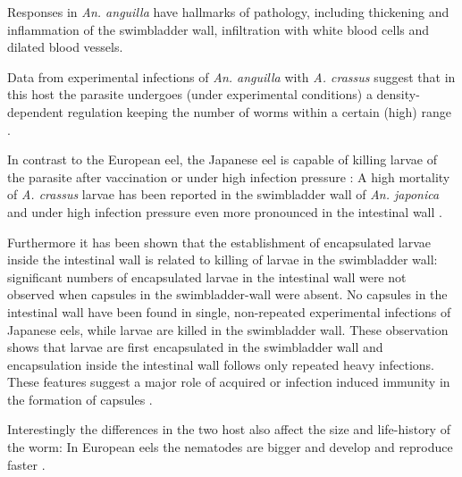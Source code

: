 Responses in \textit{An. anguilla} have hallmarks of pathology,
including thickening \cite{wurtz_tara_2000} and inflammation
\cite{beregi_radiodiagnostic_1998} of the swimbladder wall,
infiltration with white blood cells and dilated blood vessels.

Data from experimental infections of \textit{An. anguilla} with
\textit{A. crassus} suggest that in this host the parasite undergoes
(under experimental conditions) a density-dependent regulation keeping
the number of worms within a certain (high) range
\cite{fazio_regulation_2008}.

In contrast to the European eel, the Japanese eel is capable of
killing larvae of the parasite after vaccination
\cite{knopf_vaccination_2008} or under high infection pressure
\cite{heitlinger_massive_2009}: A high mortality of
\textit{A. crassus} larvae has been reported in the swimbladder wall
of \textit{An. japonica} \cite{mnderle_occurrence_2006} and under high
infection pressure even more pronounced in the intestinal wall
\cite{heitlinger_massive_2009}.

Furthermore it has been shown that the establishment of encapsulated
larvae inside the intestinal wall is related to killing of larvae in
the swimbladder wall: significant numbers of encapsulated larvae in
the intestinal wall were not observed when capsules in the
swimbladder-wall were absent. No capsules in the intestinal wall have
been found in single, non-repeated experimental infections of Japanese
eels, while larvae are killed in the swimbladder wall. These
observation shows that larvae are first encapsulated in the
swimbladder wall and encapsulation inside the intestinal wall follows
only repeated heavy infections. These features suggest a major role of
acquired or infection induced immunity in the formation of capsules
\cite{heitlinger_massive_2009}.

Interestingly the differences in the two host also affect the size and
life-history of the worm: In European eels the nematodes are bigger
and develop and reproduce faster \cite{knopf_differences_2004}.



